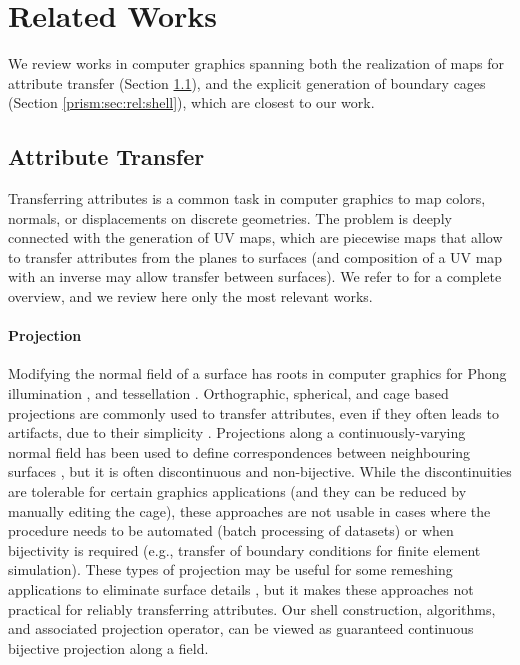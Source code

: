 
\section{Related Works}
\label{prism:sec:related}
We review works in computer graphics spanning both the realization of maps for attribute transfer (Section \ref{prism:sec:rel:transfer}), and the explicit generation of boundary cages (Section \ref{prism:sec:rel:shell}), which are closest to our work.

\subsection{Attribute Transfer}
\label{prism:sec:rel:transfer}

Transferring attributes is a common task in computer graphics to map colors, normals, or displacements on discrete geometries. 
The problem is deeply connected with the generation of UV maps, which are piecewise maps that allow to transfer attributes from the planes to surfaces (and composition of a UV map with an inverse may allow transfer between surfaces).  We refer to \cite{FloaterSurvey:2005,Sheffer:2006,Hormann:2007} for a complete overview, and we review here only the most relevant works.

\paragraph{Projection} 
Modifying the normal field of a surface has roots in computer graphics for Phong illumination \cite{phong1975illumination}, and tessellation \cite{boubekeur2008phong}.  Orthographic, spherical, and cage based projections are commonly used to transfer attributes, even if they often leads to artifacts, due to their simplicity {\cite{blender,nguyen2007gpu}}. 
Projections along a continuously-varying normal field has been used to define correspondences between neighbouring surfaces \cite{kobbelt1998interactive,lee2000displaced,panozzo2013weighted,Ezuz:2019}, but it is often discontinuous and non-bijective. While the discontinuities are tolerable for certain graphics applications (and they can be reduced by manually editing the cage), these approaches are not usable in cases where the procedure needs to be automated (batch processing of datasets) or when bijectivity is required (e.g., transfer of boundary conditions for finite element simulation).  These types of projection may be useful for some remeshing applications to eliminate surface details \cite{ebke2014level}, but it makes these approaches not practical for reliably transferring attributes. Our shell construction, algorithms, and associated projection operator, can be viewed as guaranteed continuous bijective  projection along a field. 


